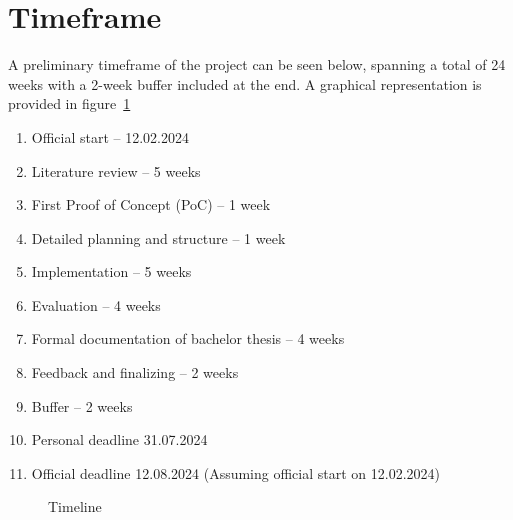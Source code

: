 \chapter*{Timeframe}
A preliminary timeframe of the project can be seen below, spanning a total of 24 weeks with a 2-week buffer included at the end.
A graphical representation is provided in figure~\ref{fig:timeline}

\begin{enumerate}
    \item Official start -- 12.02.2024
    \item Literature review -- 5 weeks
    \item First Proof of Concept (PoC) -- 1 week
    \item Detailed planning and structure -- 1 week
    \item Implementation -- 5 weeks
    \item Evaluation -- 4 weeks
    \item Formal documentation of bachelor thesis -- 4 weeks
    \item Feedback and finalizing -- 2 weeks
    \item Buffer -- 2 weeks
    \item Personal deadline 31.07.2024
    \item Official deadline 12.08.2024 (Assuming official start on 12.02.2024)
\end{enumerate}

\begin{figure}[t]
    \centering
    \caption{Timeline}\label{fig:timeline}
\end{figure}%
